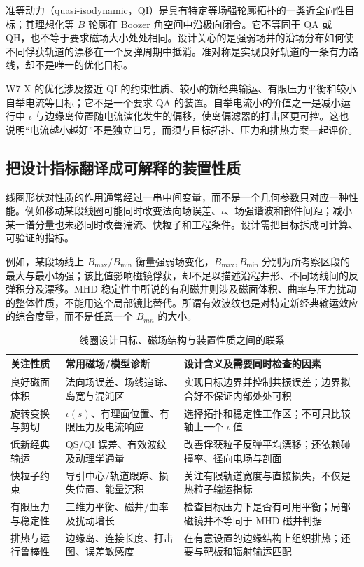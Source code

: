 \documentclass[12pt,fontset=none]{ctexart}
\numberwithin{equation}{section}
\numberwithin{table}{section}
\numberwithin{figure}{section}
\begin{document}
准等动力（quasi-isodynamic，QI）是具有特定等场强轮廓拓扑的一类近全向性目标；其理想化等 $B$ 轮廓在 Boozer 角空间中沿极向闭合。它不等同于 QA 或 QH，也不等于要求磁场大小处处相同。设计关心的是强弱场井的沿场分布如何使不同俘获轨道的漂移在一个反弹周期中抵消。准对称是实现良好轨道的一条有力路线，却不是唯一的优化目标。

W7-X 的优化涉及接近 QI 的约束性质、较小的新经典输运、有限压力平衡和较小自举电流等目标；它不是一个要求 QA 的装置。自举电流小的价值之一是减小运行中 $\iota$ 与边缘岛位置随电流演化发生的偏移，使岛偏滤器的打击区更可控\cite{Sw7x,Sbootstrap}。这也说明``电流越小越好''不是独立口号，而须与目标拓扑、压力和排热方案一起评价。

\subsection{把设计指标翻译成可解释的装置性质}\label{sec:stellarator-properties}

线圈形状对性质的作用通常经过一串中间变量，而不是一个几何参数只对应一种性能。例如移动某段线圈可能同时改变法向场误差、$\iota$、场强谐波和部件间距；减小某一谱分量也未必同时改善湍流、快粒子和工程条件。设计需把目标拆成可计算、可验证的指标。

例如，某段场线上 $B_{\max}/B_{\min}$ 衡量强弱场变化，$B_{\max},B_{\min}$ 分别为所考察区段的最大与最小场强；该比值影响磁镜俘获，却不足以描述沿程井形、不同场线间的反弹积分及漂移。MHD 稳定性中所说的有利磁井则涉及磁面体积、曲率与压力扰动的整体性质，不能用这个局部镜比替代。所谓有效波纹也是对特定新经典输运效应的综合度量，而不是任意一个 $B_{mn}$ 的大小。

\begin{table}[htbp]
\centering\small
\caption{线圈设计目标、磁场结构与装置性质之间的联系}\label{tab:stellarator-properties}
\begin{tabular}{L{2.3cm}L{5.2cm}L{6.0cm}}
\toprule 关注性质 & 常用磁场/模型诊断 & 设计含义及需要同时检查的因素 \\
\midrule
良好磁面体积 & 法向场误差、场线追踪、岛宽与混沌区 & 实现目标边界并控制共振误差；边界拟合好不保证内部处处可积 \\
旋转变换与剪切 & $\iota(s)$、有理面位置、有限压力及电流响应 & 选择拓扑和稳定性工作区；不可只比较轴上一个 $\iota$ 值 \\
低新经典输运 & QS/QI 误差、有效波纹及动理学通量 & 改善俘获粒子反弹平均漂移；还依赖碰撞率、径向电场与剖面 \\
快粒子约束 & 导引中心/轨道跟踪、损失位置、能量沉积 & 关注有限轨道宽度与直接损失，不仅是热粒子输运指标 \\
有限压力与稳定性 & 三维力平衡、磁井/曲率及扰动增长 & 检查目标压力下是否有可用平衡；局部磁镜井不等同于 MHD 磁井判据 \\
排热与运行鲁棒性 & 边缘岛、连接长度、打击图、误差敏感度 & 在有意设置的边缘结构上组织排热；还要与靶板和辐射输运匹配 \\
\bottomrule
\end{tabular}
\end{table}
\end{document}
